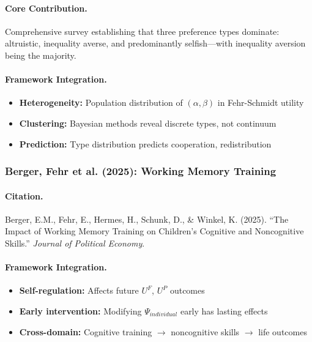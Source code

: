 \paragraph{Core Contribution.}
Comprehensive survey establishing that three preference types dominate:
altruistic, inequality averse, and predominantly selfish---with inequality
aversion being the majority.

\paragraph{Framework Integration.}
\begin{itemize}
  \item \textbf{Heterogeneity:} Population distribution of $(\alpha, \beta)$ 
        in Fehr-Schmidt utility
  \item \textbf{Clustering:} Bayesian methods reveal discrete types, not continuum
  \item \textbf{Prediction:} Type distribution predicts cooperation, redistribution
\end{itemize}

\subsubsection{Berger, Fehr et al. (2025): Working Memory Training}

\paragraph{Citation.}
Berger, E.M., Fehr, E., Hermes, H., Schunk, D., \& Winkel, K. (2025).
``The Impact of Working Memory Training on Children's Cognitive and Noncognitive Skills.''
\emph{Journal of Political Economy}.

\paragraph{Framework Integration.}
\begin{itemize}
  \item \textbf{Self-regulation:} Affects future $U^F$, $U^P$ outcomes
  \item \textbf{Early intervention:} Modifying $\Psi_{individual}$ early has lasting effects
  \item \textbf{Cross-domain:} Cognitive training $\to$ noncognitive skills $\to$ life outcomes
\end{itemize}


